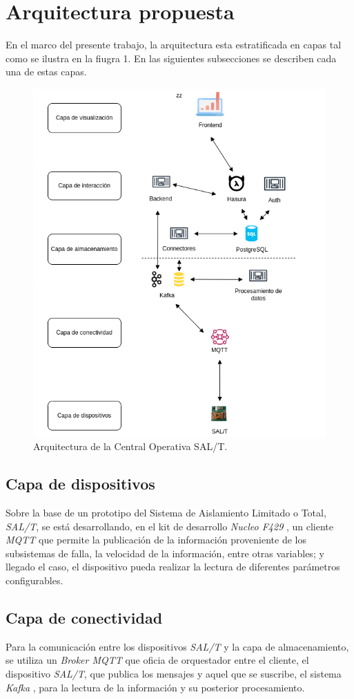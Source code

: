 \documentclass[a4paper]{IEEEtran}
\begin{document}
\section{Arquitectura propuesta}

En el marco del presente trabajo, la arquitectura esta estratificada en capas
tal como se ilustra en la fiugra 1. En las siguientes subsecciones se describen cada una de estas capas.

\begin{figure}[ht]
\centering 
\includegraphics[width=.5\textwidth]{diagram.png}
\caption{Arquitectura de la Central Operativa SAL/T.}
\label{fig:diagBloques}
\end{figure}


\subsection{Capa de dispositivos}

Sobre la base de un prototipo del Sistema de Aislamiento Limitado o Total, \textit{SAL/T}, se está desarrollando, en el kit de desarrollo \textit{Nucleo F429} \cite{b5}, un cliente \textit{MQTT} \cite{b6} que permite la publicación de la información proveniente de los subsistemas de falla, la velocidad de la información, entre otras variables; y llegado el caso, el dispositivo pueda realizar la lectura de diferentes parámetros configurables.

\subsection{Capa de conectividad}

Para la comunicación entre los dispositivos \textit{SAL/T} y la capa de almacenamiento, se utiliza un \textit{Broker MQTT} que oficia de orquestador entre el cliente, el dispositivo \textit{SAL/T}, que publica los mensajes y aquel que se suscribe, el sistema \textit{Kafka} \cite{b7}, para la lectura de la información y su posterior procesamiento. \\ 
\end{document}
